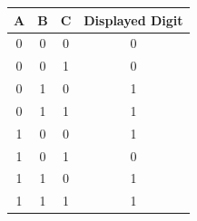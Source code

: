 \documentclass[12pt,a4paper]{article}
\begin{document}
\begin{center}
\begin{tabular}{|c|c|c|c|}
\hline
\textbf{A} & \textbf{B} & \textbf{C} & \textbf{Displayed Digit} \\
\hline
0 & 0 & 0 & 0 \\
\hline
0 & 0 & 1 & 0 \\
\hline
0 & 1 & 0 & 1 \\
\hline
0 & 1 & 1 & 1 \\
\hline
1 & 0 & 0 & 1 \\
\hline
1 & 0 & 1 & 0 \\
\hline
1 & 1 & 0 & 1 \\
\hline
1 & 1 & 1 & 1 \\
\hline
\end{tabular}
\end{center}
\end{document}
